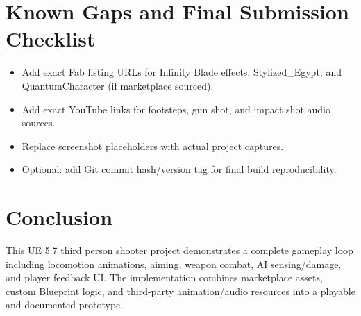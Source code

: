 \documentclass[12pt]{article}
\begin{document}
\section{Known Gaps and Final Submission Checklist}
\begin{itemize}[leftmargin=*]
  \item Add exact Fab listing URLs for Infinity Blade effects, Stylized\_Egypt, and QuantumCharacter (if marketplace sourced).
  \item Add exact YouTube links for footsteps, gun shot, and impact shot audio sources.
  \item Replace screenshot placeholders with actual project captures.
  \item Optional: add Git commit hash/version tag for final build reproducibility.
\end{itemize}

\section{Conclusion}
This UE 5.7 third person shooter project demonstrates a complete gameplay loop including locomotion animations, aiming, weapon combat, AI sensing/damage, and player feedback UI. The implementation combines marketplace assets, custom Blueprint logic, and third-party animation/audio resources into a playable and documented prototype.
\end{document}
